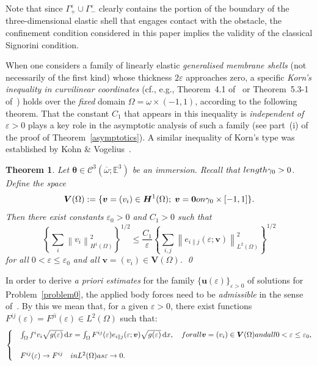 \documentclass{amsart}
\newtheorem{theorem}{Theorem}[section]
\def\dd{\, \mathrm{d}}
\begin{document}
Note that since $\Gamma^\varepsilon_+ \cup \Gamma^\varepsilon_{-}$ clearly contains the portion of the boundary of the three-dimensional elastic shell that engages contact with the obstacle, the confinement condition considered in this paper implies the validity of the classical Signorini condition.

When one considers a family of linearly elastic \emph{generalised membrane shells} (not necessarily of the first kind) whose thickness $2 \varepsilon$ approaches zero, a specific \emph{Korn's inequality in curvilinear coordinates} (cf., e.g., Theorem~4.1 of~\cite{CiaLodsMia1996} or Theorem~5.3-1 of~\cite{Ciarlet2000}) holds over the \emph{fixed} domain $\Omega = \omega \times (-1,1)$, according to the following theorem. That the constant $C_1$ that appears in this inequality is \emph{independent of} $\varepsilon > 0$ plays a key role in the asymptotic analysis of such a family (see part~(i) of the proof of Theorem~\ref{asymptotics}). A similar inequality of Korn's type was established by Kohn \& Vogelius~\cite{KV1985}.

\begin{theorem}\label{t:4}
Let $\bm{\theta} \in \mathcal{C}^3(\overline{\omega};\mathbb{E}^3)$ be an immersion.
Recall that $\textup{length }\gamma_0>0$.
Define the space
$$
\bm{V} (\Omega) := \{\bm{v} = (v_i) \in \bm{H}^1(\Omega) ; \; \bm{v} = \bm{0} \textup{ on }  \gamma_0 \times [-1,1]\}.
$$
Then there exist constants $\varepsilon_0 > 0$ and $C_1 > 0$ such that
$$
  \left\{ \sum_i \left\| v_i \right\|^2_{H^1(\Omega)}\right\}^{1/2} \le \dfrac{C_1}{\varepsilon} \left\{ \sum_{i,j} \left\| e_{i\|j} (\varepsilon; \bm{v}) \right\|^2_{L^2(\Omega)} \right\}^{1/2}
$$
for all $0 < \varepsilon \leq \varepsilon_0$ and all $\bm{v}=(v_i) \in \bm{V} (\Omega)$.
\qed
\end{theorem}

In order to derive \emph{a priori estimates} for the family $\{\bm{u}(\varepsilon)\}_{\varepsilon>0}$ of solutions for Problem~\ref{problem0}, the applied body forces need to be \emph{admissible} in the sense of~\cite{Ciarlet2000}. By this we mean that, for a given $\varepsilon>0$, there exist functions $F^{ij}(\varepsilon)=F^{ji}(\varepsilon) \in L^2(\Omega)$ such that:
\begin{equation}
	\label{adm-1}
\begin{cases}
&\int_{\Omega} f^i v_i \sqrt{g(\varepsilon)} \dd x = \int_{\Omega} F^{ij}(\varepsilon) e_{i\|j}(\varepsilon;\bm{v}) \sqrt{g(\varepsilon)} \dd x,\quad \textup{ for all }\bm{v} = (v_i) \in \bm{V}(\Omega) \textup{ and all } 0<\varepsilon\le \varepsilon_0,\\
\\
&F^{ij}(\varepsilon) \to F^{ij} \quad\textup{ in }L^2(\Omega) \textup{ as }\varepsilon\to 0.
\end{cases}
\end{equation}
\end{document}

